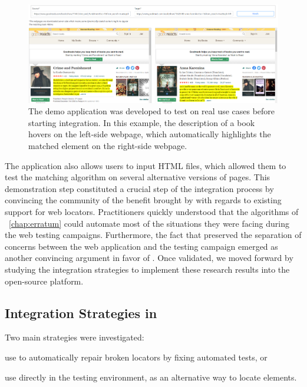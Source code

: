 \begin{figure}[]
    \centering
    \includegraphics[width=\linewidth]{cerberus/explanations/demo_matching}
    \caption{The demo application was developed to test \erratum on real use cases before starting integration. In this example, the description of a book hovers on the left-side webpage, which automatically highlights the matched element on the right-side webpage.}
    \label{cerberus:fig:demo_app}
\end{figure}

The application also allows users to input HTML files, which allowed them to test the matching algorithm on several alternative versions of pages.
This demonstration step constituted a crucial step of the integration process by convincing the \cerberus community of the benefit brought by \erratum with regards to existing support for web locators.
Practitioners quickly understood that the algorithms of \erratum~\ref{chap:erratum} could automate most of the situations they were facing during the web testing campaigns.
Furthermore, the fact that \erratum preserved the separation of concerns between the web application and the testing campaign emerged as another convincing argument in favor of \erratum.
Once validated, we moved forward by studying the integration strategies to implement these research results into the open-source platform.

\subsection{Integration Strategies in \cerberus}
Two main strategies were investigated:
\begin{inparaenum}[\em (i)]
\item use \erratum to automatically repair broken locators by fixing automated tests, or
\item use \erratum directly in the \cerberus testing environment, as an alternative way to locate elements.
\end{inparaenum}

